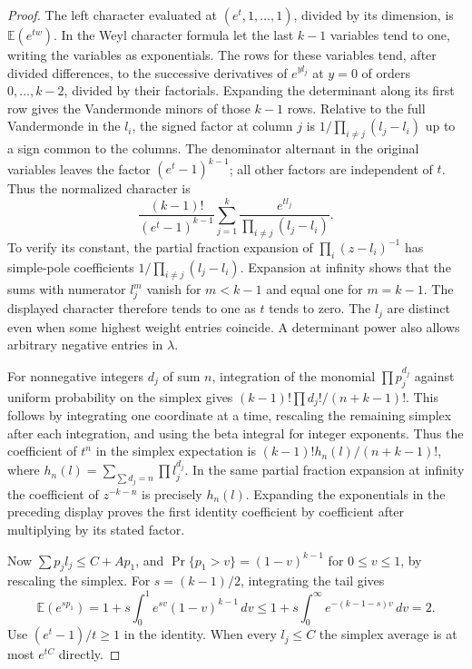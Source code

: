 \documentclass[a4paper,11pt]{article}
\theoremstyle{definition}
\theoremstyle{remark}
\numberwithin{equation}{section}
\begin{document}
\begin{proof}
The left character evaluated at \((e^t,1,\ldots,1)\), divided
by its dimension, is \(\mathbb E(e^{tw})\). In the Weyl character
formula let the last \(k-1\) variables tend to one, writing the
variables as exponentials. The rows for these variables tend,
after divided differences, to the successive derivatives of
\(e^{yl_j}\) at \(y=0\) of orders \(0,\ldots,k-2\), divided by
their factorials. Expanding the determinant along its first
row gives the Vandermonde minors of those \(k-1\) rows. Relative
to the full Vandermonde in the \(l_i\), the signed factor at
column \(j\) is \(1/\prod_{i\ne j}(l_j-l_i)\) up to a sign
common to the columns. The denominator alternant in the
original variables leaves the factor \((e^t-1)^{k-1}\); all
other factors are independent of \(t\). Thus the normalized
character is
\[
   \frac{(k-1)!}{(e^t-1)^{k-1}}
             \sum_{j=1}^k\frac{e^{tl_j}}{\prod_{i\ne j}(l_j-l_i)}.
\]
To verify its constant, the partial fraction expansion of
\(\prod_i(z-l_i)^{-1}\) has simple-pole coefficients
\(1/\prod_{i\ne j}(l_j-l_i)\). Expansion at infinity shows
that the sums with numerator \(l_j^m\) vanish for \(m<k-1\)
and equal one for \(m=k-1\). The displayed character therefore
tends to one as \(t\) tends to zero. The \(l_j\) are distinct
even when some highest weight entries coincide. A determinant
power also allows arbitrary negative entries in \(\lambda\).

For nonnegative integers \(d_j\) of sum \(n\), integration
of the monomial \(\prod p_j^{d_j}\) against uniform probability
on the simplex gives \((k-1)!\prod d_j!/(n+k-1)!\). This follows
by integrating one coordinate at a time, rescaling the remaining
simplex after each integration, and using the beta integral for
integer exponents. Thus the coefficient of \(t^n\) in the
simplex expectation is \((k-1)!h_n(l)/(n+k-1)!\), where
\(h_n(l)=\sum_{\sum d_j=n}\prod l_j^{d_j}\). In the same
partial fraction expansion at infinity the coefficient of
\(z^{-k-n}\) is precisely \(h_n(l)\). Expanding the exponentials
in the preceding display proves the first identity coefficient
by coefficient after multiplying by its stated factor.

Now \(\sum p_jl_j\le C+A p_1\), and
\(\Pr\{p_1>v\}=(1-v)^{k-1}\) for \(0\le v\le1\), by
rescaling the simplex. For \(s=(k-1)/2\), integrating the tail
gives
\[
      \mathbb E(e^{s p_1})
       =1+s\int_0^1 e^{sv}(1-v)^{k-1}\,dv
       \le 1+s\int_0^\infty e^{-(k-1-s)v}\,dv=2 .
\]
Use \((e^t-1)/t\ge1\) in the identity. When every \(l_j\le C\)
the simplex average is at most \(e^{tC}\) directly.
\end{proof}
\end{document}
